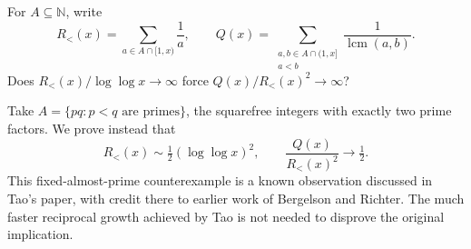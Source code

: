 For $A\subseteq\mathbb N$, write
\[R_<(x)=\sum_{a\in A\cap[1,x)}\frac1a,\qquad
Q(x)=\sum_{\substack{a,b\in A\cap(1,x]\\a<b}}\frac1{\operatorname{lcm}(a,b)}.\]
Does $R_<(x)/\log\log x\to\infty$ force $Q(x)/R_<(x)^2\to\infty$?

Take $A=\{pq:p<q\text{ are primes}\}$, the squarefree integers with exactly two prime factors. We prove instead that
\[R_<(x)\sim\tfrac12(\log\log x)^2,
\qquad \frac{Q(x)}{R_<(x)^2}\longrightarrow\tfrac12.\tag{1}\]
This fixed-almost-prime counterexample is a known observation discussed in Tao's paper, with credit there to earlier work of Bergelson and Richter. The much faster reciprocal growth achieved by Tao is not needed to disprove the original implication.
